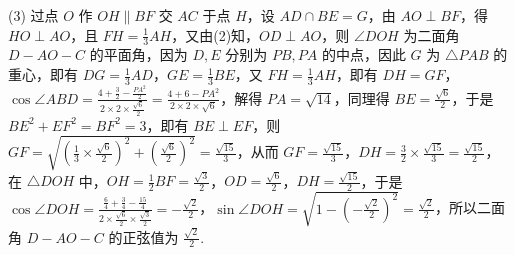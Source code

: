 \begin{question}[points=12]
\begin{solution}
(3) 过点 $O$ 作 $OH\parallel BF$ 交 $AC$ 于点 $H$，设 $AD\cap BE=G$，由 $AO\perp BF$，得 $HO\perp AO$，且 $FH=\frac{1}{3}AH$，又由(2)知，$OD\perp AO$，则 $\angle DOH$ 为二面角 $D-AO-C$ 的平面角，因为 $D,E$ 分别为 $PB,PA$ 的中点，因此 $G$ 为 $\triangle PAB$ 的重心，即有 $DG=\frac{1}{3}AD$，$GE=\frac{1}{3}BE$，又 $FH=\frac{1}{3}AH$，即有 $DH=GF$，$\cos\angle ABD=\frac{4+\frac{3}{2}-\frac{PA^2}{2}}{2\times2\times\frac{\sqrt{6}}{2}}=\frac{4+6-PA^2}{2\times2\times\sqrt{6}}$，解得 $PA=\sqrt{14}$，同理得 $BE=\frac{\sqrt{6}}{2}$，于是 $BE^2+EF^2=BF^2=3$，即有 $BE\perp EF$，则 $GF=\sqrt{(\frac{1}{3}\times\frac{\sqrt{6}}{2})^2+(\frac{\sqrt{6}}{2})^2}=\frac{\sqrt{15}}{3}$，从而 $GF=\frac{\sqrt{15}}{3}$，$DH=\frac{3}{2}\times\frac{\sqrt{15}}{3}=\frac{\sqrt{15}}{2}$，在 $\triangle DOH$ 中，$OH=\frac{1}{2}BF=\frac{\sqrt{3}}{2}$，$OD=\frac{\sqrt{6}}{2}$，$DH=\frac{\sqrt{15}}{2}$，于是 $\cos\angle DOH=\frac{\frac{6}{4}+\frac{3}{4}-\frac{15}{4}}{2\times\frac{\sqrt{6}}{2}\times\frac{\sqrt{3}}{2}}=-\frac{\sqrt{2}}{2}$，$\sin\angle DOH=\sqrt{1-(-\frac{\sqrt{2}}{2})^2}=\frac{\sqrt{2}}{2}$，所以二面角 $D-AO-C$ 的正弦值为 $\frac{\sqrt{2}}{2}$.
\end{solution}
\end{question}

